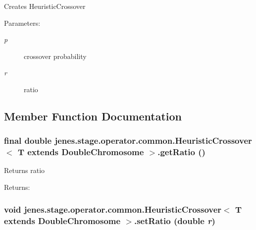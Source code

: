 Creates HeuristicCrossover

\begin{Desc}
\item[Parameters:]
\begin{description}
\item[{\em p}]crossover probability \item[{\em r}]ratio \end{description}
\end{Desc}


\subsection{Member Function Documentation}
\hypertarget{classjenes_1_1stage_1_1operator_1_1common_1_1_heuristic_crossover_3_01_t_01extends_01_double_chromosome_01_4_cab7758424b5132b15579fff5da094d5}{
\subsubsection[getRatio]{\setlength{\rightskip}{0pt plus 5cm}final double jenes.stage.operator.common.HeuristicCrossover$<$ T extends {\bf DoubleChromosome} $>$.getRatio ()}}
\label{classjenes_1_1stage_1_1operator_1_1common_1_1_heuristic_crossover_3_01_t_01extends_01_double_chromosome_01_4_cab7758424b5132b15579fff5da094d5}


Returns ratio \begin{Desc}
\item[Returns:]\end{Desc}
\hypertarget{classjenes_1_1stage_1_1operator_1_1common_1_1_heuristic_crossover_3_01_t_01extends_01_double_chromosome_01_4_dec77409f57afee4170cacb806e7254c}{
\subsubsection[setRatio]{\setlength{\rightskip}{0pt plus 5cm}void jenes.stage.operator.common.HeuristicCrossover$<$ T extends {\bf DoubleChromosome} $>$.setRatio (double {\em r})}}
\label{classjenes_1_1stage_1_1operator_1_1common_1_1_heuristic_crossover_3_01_t_01extends_01_double_chromosome_01_4_dec77409f57afee4170cacb806e7254c}


